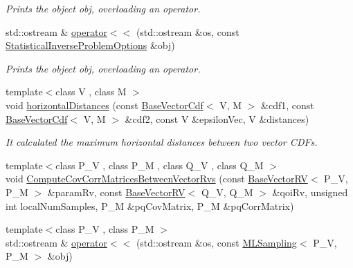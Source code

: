 \begin{DoxyCompactItemize}
\begin{DoxyCompactList}\small\item\em Prints the object {\ttfamily obj}, overloading an operator. \end{DoxyCompactList}\item 
std\-::ostream \& \hyperlink{namespace_q_u_e_s_o_a408c51750e38ef3c04031a801f572e8b}{operator$<$$<$} (std\-::ostream \&os, const \hyperlink{class_q_u_e_s_o_1_1_statistical_inverse_problem_options}{Statistical\-Inverse\-Problem\-Options} \&obj)
\begin{DoxyCompactList}\small\item\em Prints the object {\ttfamily obj}, overloading an operator. \end{DoxyCompactList}\item 
{\footnotesize template$<$class V , class M $>$ }\\void \hyperlink{namespace_q_u_e_s_o_aa34cd1eb7f035b5e6f8d8c090f02d65f}{horizontal\-Distances} (const \hyperlink{class_q_u_e_s_o_1_1_base_vector_cdf}{Base\-Vector\-Cdf}$<$ V, M $>$ \&cdf1, const \hyperlink{class_q_u_e_s_o_1_1_base_vector_cdf}{Base\-Vector\-Cdf}$<$ V, M $>$ \&cdf2, const V \&epsilon\-Vec, V \&distances)
\begin{DoxyCompactList}\small\item\em It calculated the maximum horizontal distances between two vector C\-D\-Fs. \end{DoxyCompactList}\item 
{\footnotesize template$<$class P\-\_\-\-V , class P\-\_\-\-M , class Q\-\_\-\-V , class Q\-\_\-\-M $>$ }\\void \hyperlink{namespace_q_u_e_s_o_a4b9472b3a017ccaffbea8cc69b96afac}{Compute\-Cov\-Corr\-Matrices\-Between\-Vector\-Rvs} (const \hyperlink{class_q_u_e_s_o_1_1_base_vector_r_v}{Base\-Vector\-R\-V}$<$ P\-\_\-\-V, P\-\_\-\-M $>$ \&param\-Rv, const \hyperlink{class_q_u_e_s_o_1_1_base_vector_r_v}{Base\-Vector\-R\-V}$<$ Q\-\_\-\-V, Q\-\_\-\-M $>$ \&qoi\-Rv, unsigned int local\-Num\-Samples, P\-\_\-\-M \&pq\-Cov\-Matrix, P\-\_\-\-M \&pq\-Corr\-Matrix)
\item 
{\footnotesize template$<$class P\-\_\-\-V , class P\-\_\-\-M $>$ }\\std\-::ostream \& \hyperlink{namespace_q_u_e_s_o_a8da6c5c5bdc3addfa97ccad5eebbfd7c}{operator$<$$<$} (std\-::ostream \&os, const \hyperlink{class_q_u_e_s_o_1_1_m_l_sampling}{M\-L\-Sampling}$<$ P\-\_\-\-V, P\-\_\-\-M $>$ \&obj)
\end{DoxyCompactItemize}
